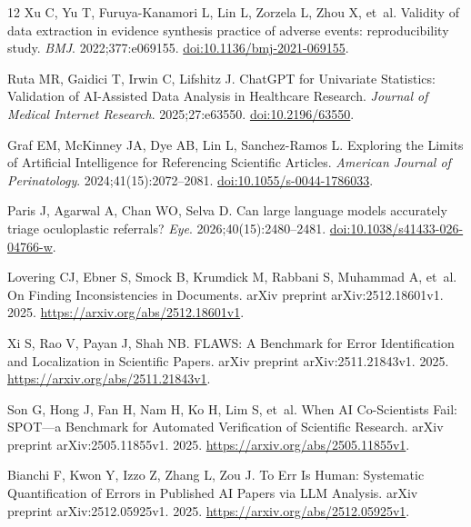 \documentclass[12pt,a4paper]{article}
\begin{document}
\begin{thebibliography}{12}
Xu C, Yu T, Furuya-Kanamori L, Lin L, Zorzela L, Zhou X, et~al. Validity of data extraction in evidence synthesis practice of adverse events: reproducibility study.
\emph{BMJ}. 2022;377:e069155.
\href{https://doi.org/10.1136/bmj-2021-069155}{doi:10.1136/bmj-2021-069155}.

Ruta MR, Gaidici T, Irwin C, Lifshitz J. {ChatGPT} for Univariate Statistics: Validation of {AI}-Assisted Data Analysis in Healthcare Research.
\emph{Journal of Medical Internet Research}. 2025;27:e63550.
\href{https://doi.org/10.2196/63550}{doi:10.2196/63550}.

Graf EM, McKinney JA, Dye AB, Lin L, Sanchez-Ramos L. Exploring the Limits of Artificial Intelligence for Referencing Scientific Articles.
\emph{American Journal of Perinatology}. 2024;41(15):2072--2081.
\href{https://doi.org/10.1055/s-0044-1786033}{doi:10.1055/s-0044-1786033}.

Paris J, Agarwal A, Chan WO, Selva D. Can large language models accurately triage oculoplastic referrals?
\emph{Eye}. 2026;40(15):2480--2481.
\href{https://doi.org/10.1038/s41433-026-04766-w}{doi:10.1038/s41433-026-04766-w}.

Lovering CJ, Ebner S, Smock B, Krumdick M, Rabbani S, Muhammad A, et~al. On Finding Inconsistencies in Documents.
arXiv preprint arXiv:2512.18601v1. 2025.
\url{https://arxiv.org/abs/2512.18601v1}.

Xi S, Rao V, Payan J, Shah NB. {FLAWS}: A Benchmark for Error Identification and Localization in Scientific Papers.
arXiv preprint arXiv:2511.21843v1. 2025.
\url{https://arxiv.org/abs/2511.21843v1}.

Son G, Hong J, Fan H, Nam H, Ko H, Lim S, et~al. When {AI} Co-Scientists Fail: {SPOT}---a Benchmark for Automated Verification of Scientific Research.
arXiv preprint arXiv:2505.11855v1. 2025.
\url{https://arxiv.org/abs/2505.11855v1}.

Bianchi F, Kwon Y, Izzo Z, Zhang L, Zou J. To Err Is Human: Systematic Quantification of Errors in Published {AI} Papers via {LLM} Analysis.
arXiv preprint arXiv:2512.05925v1. 2025.
\url{https://arxiv.org/abs/2512.05925v1}.


\end{thebibliography}
\end{document}
